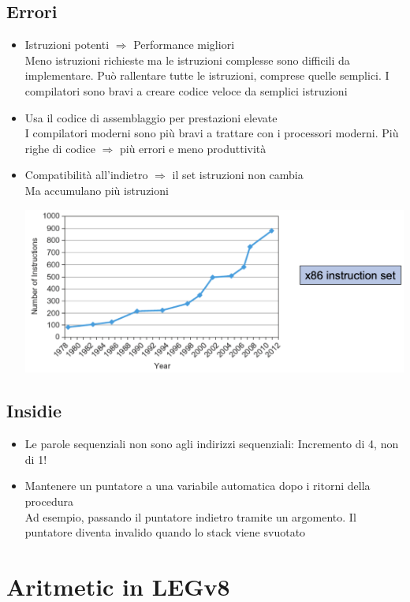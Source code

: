 \documentclass[12pt,a4paper]{article}
\begin{document}
\subsection{Errori}
\begin{itemize}
\item Istruzioni potenti $\Rightarrow$ Performance migliori\\
Meno istruzioni richieste ma le istruzioni complesse sono difficili da implementare. Può rallentare tutte le istruzioni, comprese quelle semplici. I compilatori sono bravi a creare codice veloce da semplici istruzioni
\item Usa il codice di assemblaggio per prestazioni elevate\\
I compilatori moderni sono più bravi a trattare con i processori moderni. Più righe di codice $\Rightarrow$ più errori e meno produttività
\item Compatibilità all'indietro $\Rightarrow$ il set istruzioni non cambia\\
Ma accumulano più istruzioni
\begin{center}
\includegraphics[width=0.5\columnwidth]{img/istruzioni_x86.png}
\end{center}
\end{itemize}

\subsection{Insidie}
\begin{itemize}
\item Le parole sequenziali non sono agli indirizzi sequenziali: Incremento di 4, non di 1!
\item Mantenere un puntatore a una variabile automatica dopo i ritorni della procedura\\
Ad esempio, passando il puntatore indietro tramite un argomento. Il puntatore diventa invalido quando lo stack viene svuotato
\end{itemize}

\clearpage
\section{Aritmetic in LEGv8}
\end{document}

